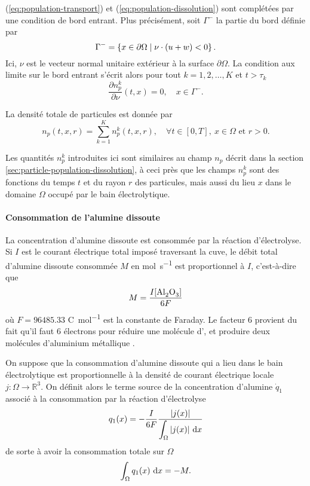 (\ref{eq:population-transport}) et (\ref{eq:population-dissolution})
sont complétées par une condition de bord entrant. Plus
précisément, soit $\Gamma^-$ la partie du bord
définie par
\begin{equation}\label{eq:np-bc}
  \Gamma^- = \left\{ x\in\partial\Omega \mid \nu \cdot \left( u + w \right)
  < 0 \right\}.
\end{equation}
Ici, $\nu$ est le vecteur normal unitaire extérieur à la surface
$\partial \Omega$. La condition aux limite sur le bord entrant s'écrit
alors pour tout $k = 1, 2, \dots, K$ et $t > \tau_k$
\begin{equation}
\frac{\partial n_p^k}{\partial \nu}(t, x) = 0, \quad x\in\Gamma^-.
\end{equation}

La densité totale de particules est donnée par
\begin{equation}
  n_p(t, x, r) = \sum_{k=1}^K n_p^k(t, x, r), \quad \forall t\in[0,
    T],\ x \in \Omega\text{ et } r > 0.
\end{equation}

\begin{remarque}
Les quantités $n_p^k$ introduites ici sont similaires au champ $n_p$
décrit dans la section \ref{sec:particle-population-dissolution}, à
ceci près que les champs $n_p^k$ sont des fonctions du temps $t$ et du
rayon $r$ des particules, mais aussi du lieu $x$ dans le domaine
$\Omega$ occupé par le bain électrolytique.
\end{remarque}

\paragraph{Consommation de l'alumine dissoute}
La concentration d'alumine dissoute est consommée par la réaction
d'électrolyse. Si $I$ est le courant électrique total imposé
traversant la cuve, le débit total d'alumine dissoute consommée $M$ en
\si{\mol\per\second} est proportionnel à $I$, c'est-à-dire que
\begin{equation}
  M = \frac{I[\ce{Al2O3}]}{6\faraday}
\end{equation}
où $F = \num{96485.33}$ \si{\coulomb\per\mol} est la constante de
Faraday. Le facteur \num{6} provient du fait qu'il
faut \num{6} électrons pour réduire une molécule d', et
produire deux molécules d'aluminium métallique .

On suppose que la consommation d'alumine dissoute qui a lieu dans le
bain électrolytique est proportionnelle à la densité de courant
électrique locale $j:\Omega\to\mathbb R^3$. On définit alors le terme
source de la concentration d'alumine $\dot q_1$ associé à la
consommation par la réaction d'électrolyse
\begin{equation}
  q_1(x) = -\frac{I}{6\faraday} %
  \frac{\abs{j(x)}}{\displaystyle\int_\Omega\abs{j(x)}\intd{x}}
\end{equation}
de sorte à avoir la consommation totale sur $\Omega$
\begin{equation}
  \int_\Omega q_1(x)\,\,\mathrm dx = -M.
\end{equation}

